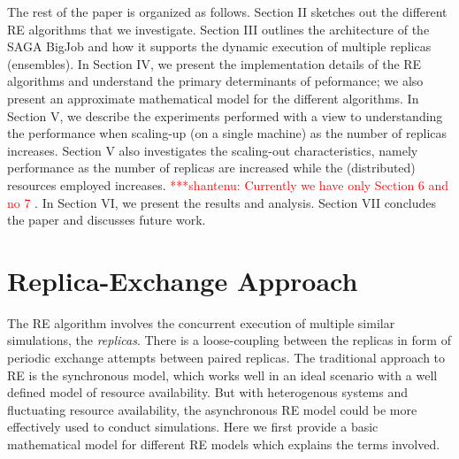 \documentclass{rspublic}
\newcommand{\jhanote}[1]{ {\textcolor{red} { ***shantenu: #1 }}}
\newcommand{\alnote}[1]{ {\textcolor{blue} { ***andre: #1 }}}
\newcommand{\alnote}[1]{}
\newcommand{\jhanote}[1]{}
\begin{document}
The rest of the paper is organized as follows. Section II sketches out
the different RE algorithms that we investigate. Section III outlines
the architecture of the SAGA BigJob and how it supports the dynamic
execution of multiple replicas (ensembles). In Section IV, we present
the implementation details of the RE algorithms and understand
the primary determinants of peformance; we also present
an approximate mathematical model for the different algorithms.
In Section V, we describe the experiments performed with a view to
understanding the performance when scaling-up (on a single machine) as
the number of replicas increases. Section V also investigates the
scaling-out characteristics, namely performance as the number of
replicas are increased while the (distributed) resources employed
increases. %
\jhanote{Currently we have only Section 6 and no 7}. In Section VI, we
present the results and analysis.  Section VII concludes the paper and
discusses future work.


\section{Replica-Exchange Approach}
\label{sec:repex-approach}
The RE algorithm involves the concurrent execution of multiple similar
simulations, the \emph{replicas}.  There is a loose-coupling between
the replicas in form of periodic exchange attempts between paired
replicas. The traditional approach to RE is the synchronous model,
which works well in an ideal scenario with a well defined model of
resource availability. But with heterogenous systems and fluctuating
resource availability, the asynchronous RE model could be more
effectively used to conduct simulations. Here we first provide a basic mathematical model for different RE models which explains the terms involved.


\end{document}
